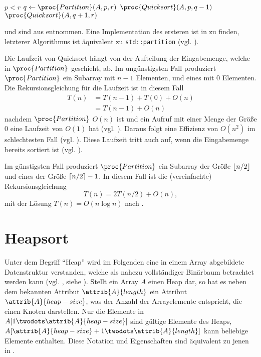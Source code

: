 \begin{codebox}
    \li \If $p < r$
    \li     \Then
                $q \gets \proc{Partition}(A, p, r)$
    \li         $\proc{Quicksort}(A, p, q - 1)$
    \li         $\proc{Quicksort}(A, q + 1, r)$
            \End
\end{codebox}

 und  sind aus \cite[171]{clrs2001} entnommen. Eine Implementation des ersteren ist in  zu finden, letzterer Algorithmus ist äquivalent zu \lstinline{std::partition} (vgl. \cite[927]{ISO-C++17}).

Die Laufzeit von Quicksort hängt von der Aufteilung der Eingabemenge, welche in $\proc{Partition}$ geschieht, ab. Im ungünstigsten Fall produziert $\proc{Partition}$ ein Subarray mit $n - 1$ Elementen, und eines mit $0$ Elementen. Die Rekursionsgleichung für die Laufzeit ist in diesem Fall
\begin{equation}\label{eq:quicks-efficiency}
\begin{split}
    T(n) &= T(n - 1) + T(0) + O(n)\\
    &= T(n - 1) + O(n)
\end{split}
\end{equation}
nachdem $\proc{Partition}$ $O(n)$ ist und ein Aufruf mit einer Menge der Größe $0$ eine Laufzeit von $O(1)$ hat (vgl. \cite[175]{clrs2001}). Daraus folgt eine Effizienz von $O(n^2)$ im schlechtesten Fall (vgl. \cite[49]{rp2013}). Diese Laufzeit tritt auch auf, wenn die Eingabemenge bereits sortiert ist (vgl. \cite[175]{clrs2001}).

Im günstigsten Fall produziert $\proc{Partition}$ ein Subarray der Größe $\left\lfloor n/2 \right\rfloor$ und eines der Größe $\left\lceil n/2 \right\rceil - 1$. In diesem Fall ist die (vereinfachte) Rekursionsgleichung
\begin{equation*}
    T(n) = 2T(n/2) + O(n),
\end{equation*}
mit der Lösung $T(n) = O(n \log n)$ nach \cite[94]{clrs2001}.

\section{Heapsort}
\label{sec:alg-selection}

Unter dem Begriff \enquote{Heap} wird im Folgenden eine in einem Array abgebildete Datenstruktur verstanden, welche als nahezu vollständiger Binärbaum betrachtet werden kann (vgl. \cite[87f]{ahu1974}, siehe ). Stellt ein Array $A$ einen Heap dar, so hat es neben dem bekannten Attribut $\attrib{A}{length}$ ein Attribut $\attrib{A}{heap-size}$, was der Anzahl der Arrayelemente entspricht, die einen Knoten darstellen. Nur die Elemente in $A[1 \twodots \attrib{A}{heap-size}]$ sind gültige Elemente des Heaps, $A[\attrib{A}{heap-size} + 1 \twodots \attrib{A}{length}]$ kann beliebige Elemente enthalten. Diese Notation und Eigenschaften sind äquivalent zu jenen in \cite{clrs2001}.

